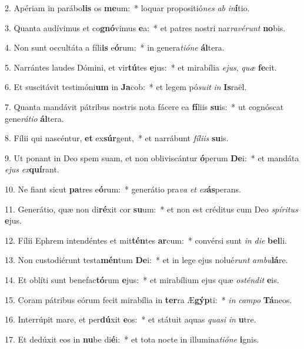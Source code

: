 2. Apériam in parábo\textbf{lis} os \textbf{me}um:~*  loquar propositió\textit{nes} \textit{ab} \textit{in}\textbf{í}tio.\

3. Quanta audívimus et co\textbf{gnó}vimus \textbf{e}a:~*  et patres nostri nar\textit{ra}\textit{vé}\textit{runt} \textbf{no}bis.\

4. Non sunt occultáta a fíli\textbf{is} e\textbf{ó}rum:~*  in genera\textit{ti}\textit{ó}\textit{ne} \textbf{ál}tera.\

5. Narrántes laudes Dómini, et vir\textbf{tú}tes \textbf{e}jus:~*  et mirabília \textit{e}\textit{jus}, \textit{quæ} \textbf{fe}cit.\

6. Et suscitávit testimóni\textbf{um} in \textbf{Ja}cob:~*  et legem pó\textit{su}\textit{it} \textit{in} \textbf{Is}raël.\

7. Quanta mandávit pátribus nostris nota fácere ea \textbf{fí}liis \textbf{su}is:~*  ut cognóscat gene\textit{rá}\textit{ti}\textit{o} \textbf{ál}tera.\

8. Fílii qui nascéntur, \textbf{et} ex\textbf{súr}gent,~*  et narrábunt \textit{fí}\textit{li}\textit{is} \textbf{su}is.\

9. Ut ponant in Deo spem suam, et non obliviscántur \textbf{ó}perum \textbf{De}i:~*  et mandáta \textit{e}\textit{jus} \textit{ex}\textbf{quí}rant.\

10. Ne fiant sicut \textbf{pa}tres e\textbf{ó}rum:~*  generátio pra\textit{va} \textit{et} \textit{ex}\textbf{ás}perans.\

11. Generátio, quæ non di\textbf{ré}xit cor \textbf{su}um:~*  et non est créditus cum Deo \textit{spí}\textit{ri}\textit{tus} \textbf{e}jus.\

12. Fílii Ephrem intendéntes et mit\textbf{tén}tes \textbf{ar}cum:~*  convérsi sunt \textit{in} \textit{di}\textit{e} \textbf{bel}li.\

13. Non custodiérunt testa\textbf{mén}tum \textbf{De}i:~*  et in lege ejus nolué\textit{runt} \textit{am}\textit{bu}\textbf{lá}re.\

14. Et oblíti sunt benefac\textbf{tó}rum \textbf{e}jus:~*  et mirabílium ejus quæ \textit{os}\textit{tén}\textit{dit} \textbf{e}is.\

15. Coram pátribus eórum fecit mirabília in \textbf{ter}ra Æ\textbf{gýp}ti:~*  \textit{in} \textit{cam}\textit{po} \textbf{Tá}neos.\

16. Interrúpit mare, et per\textbf{dú}xit \textbf{e}os:~*  et státuit aquas \textit{qua}\textit{si} \textit{in} \textbf{u}tre.\

17. Et dedúxit eos in \textbf{nu}be di\textbf{é}i:~*  et tota nocte in illumina\textit{ti}\textit{ó}\textit{ne} \textbf{i}gnis.\

